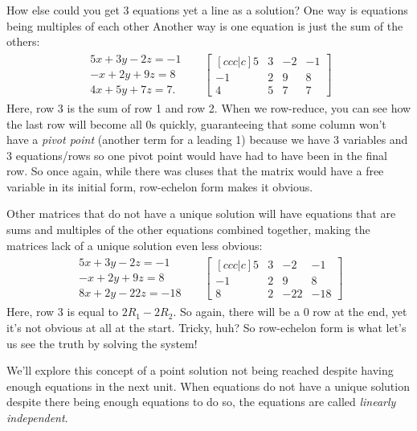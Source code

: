 \documentclass[12pt]{scrartcl}
\begin{document}
How else could you get 3 equations yet a line as a solution? One way is equations being multiples of each other Another way is one equation is just the sum of the others:
\begin{align*}
    \begin{aligned}
    5x + 3y -2z = -1 \\
    -x + 2y + 9z = 8 \\
    4x + 5y + 7z = 7.
    \end{aligned}
    &&
    \begin{bmatrix}[ccc|c]
        5 & 3 & -2 & -1 \\
        -1 & 2 & 9 & 8 \\
        4 & 5 & 7 & 7
    \end{bmatrix}
\end{align*}
Here, row 3 is the sum of row 1 and row 2. When we row-reduce, you can see how the last row will become all 0s quickly, guaranteeing that some column won't have a \textit{pivot point} (another term for a leading 1) because we have 3 variables and 3 equations/rows so one pivot point would have had to have been in the final row. So once again, while there was cluses that the matrix would have a free variable in its initial form, row-echelon form makes it obvious.

Other matrices that do not have a unique solution will have equations that are sums and multiples of the other equations combined together, making the matrices lack of a unique solution even less obvious:
\begin{align*}
    \begin{aligned}
    5x + 3y -2z = -1 \\
    -x + 2y + 9z = 8 \\
    8x + 2y - 22z = -18
    \end{aligned}
    &&
    \begin{bmatrix}[ccc|c]
        5 & 3 & -2 & -1 \\
        -1 & 2 & 9 & 8 \\
        8 & 2 & -22 & -18
    \end{bmatrix}
\end{align*}
Here, row 3 is equal to $2R_1 - 2R_2.$ So again, there will be a 0 row at the end, yet it's not obvious at all at the start. Tricky, huh? So row-echelon form is what let's us see the truth by solving the system!

We'll explore this concept of a point solution not being reached despite having enough equations in the next unit. When equations do not have a unique solution despite there being enough equations to do so, the equations are called \textit{linearly independent}.
\end{document}
